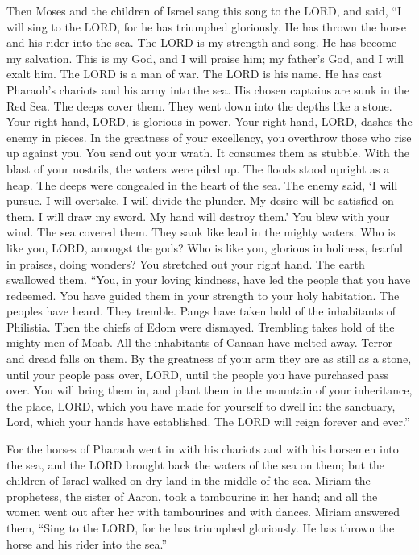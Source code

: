  Then Moses and the children of Israel sang this song to
the LORD, and said, ``I will sing to the LORD, for he has triumphed
gloriously. He has thrown the horse and his rider into the sea.
 The LORD is my strength and song. He has become my
salvation. This is my God, and I will praise him; my father's God, and I
will exalt him.  The LORD is a man of war. The LORD is his
name.  He has cast Pharaoh's chariots and his army into
the sea. His chosen captains are sunk in the Red Sea.  The
deeps cover them. They went down into the depths like a stone.
 Your right hand, LORD, is glorious in power. Your right
hand, LORD, dashes the enemy in pieces.  In the greatness
of your excellency, you overthrow those who rise up against you. You
send out your wrath. It consumes them as stubble.  With
the blast of your nostrils, the waters were piled up. The floods stood
upright as a heap. The deeps were congealed in the heart of the sea.
 The enemy said, `I will pursue. I will overtake. I will
divide the plunder. My desire will be satisfied on them. I will draw my
sword. My hand will destroy them.'  You blew with your
wind. The sea covered them. They sank like lead in the mighty waters.
 Who is like you, LORD, amongst the gods? Who is like
you, glorious in holiness, fearful in praises, doing wonders?
 You stretched out your right hand. The earth swallowed
them.  ``You, in your loving kindness, have led the
people that you have redeemed. You have guided them in your strength to
your holy habitation.  The peoples have heard. They
tremble. Pangs have taken hold of the inhabitants of Philistia.
 Then the chiefs of Edom were dismayed. Trembling takes
hold of the mighty men of Moab. All the inhabitants of Canaan have
melted away.  Terror and dread falls on them. By the
greatness of your arm they are as still as a stone, until your people
pass over, LORD, until the people you have purchased pass over.
 You will bring them in, and plant them in the mountain
of your inheritance, the place, LORD, which you have made for yourself
to dwell in: the sanctuary, Lord, which your hands have established.
 The LORD will reign forever and ever.''

 For the horses of Pharaoh went in with his chariots and
with his horsemen into the sea, and the LORD brought back the waters of
the sea on them; but the children of Israel walked on dry land in the
middle of the sea.  Miriam the prophetess, the sister of
Aaron, took a tambourine in her hand; and all the women went out after
her with tambourines and with dances.  Miriam answered
them, ``Sing to the LORD, for he has triumphed gloriously. He has thrown
the horse and his rider into the sea.''

